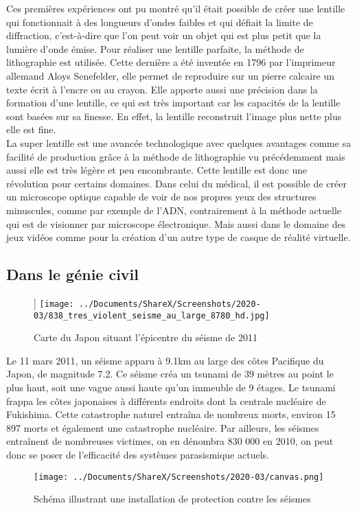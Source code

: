 \documentclass[12pt,a4paper]{article}
\begin{document}
	Ces premières expériences ont pu montré qu’il était possible de créer une lentille qui fonctionnait à des longueurs d’ondes faibles et qui défiait la limite de diffraction, c’est-à-dire que l’on peut voir un objet qui est plus petit que la lumière d’onde émise. Pour réaliser une lentille parfaite, la méthode de lithographie est utilisée. Cette dernière a été inventée en 1796 par l’imprimeur allemand Aloys Senefelder, elle permet de reproduire sur un pierre calcaire un texte écrit à l’encre ou au crayon. Elle apporte aussi une précision dans la formation d’une lentille, ce qui est très important car les capacités de la lentille sont basées sur sa finesse. En effet, la lentille reconstruit l’image plus nette plus elle est fine. \\

    La super lentille est une avancée technologique avec quelques avantages comme sa facilité de production grâce à la méthode de lithographie vu précédemment mais aussi elle est très légère et peu encombrante. Cette lentille est donc une révolution pour certains domaines. Dans celui du médical, il est possible de créer un microscope optique capable de voir de nos propres yeux des structures minuscules, comme par exemple de l’ADN, contrairement à la méthode actuelle qui est de visionner par microscope électronique. Mais aussi dans le domaine des jeux vidéos comme pour la création d’un autre type de casque de réalité virtuelle.\\
	\subsection{Dans le génie civil}

\begin{wrapfigure}{l}{7cm}]
\centering
\texttt{[image: ../Documents/ShareX/Screenshots/2020-03/838\_tres\_violent\_seisme\_au\_large\_8780\_hd.jpg]}
\caption{Carte du Japon situant l'épicentre du séisme de 2011}
\end{wrapfigure}

	
	Le 11 mars 2011, un séisme apparu à 9.1km au large des côtes Pacifique du Japon, de magnitude 7.2. Ce séisme créa un tsunami de 39 mètres au point le plus haut, soit une vague aussi haute qu’un immeuble de 9 étages. Le tsunami frappa les côtes japonaises à différents endroits dont la centrale nucléaire de Fukishima. Cette catastrophe naturel entraîna de nombreux morts, environ 15 897 morts et également une catastrophe nucléaire. 
Par ailleurs, les séismes entraînent de nombreuses victimes, on en dénombra 830 000 en 2010, on peut donc se poser de l'efficacité des systèmes parasismique actuels.
\begin{wrapfigure}{r}{5cm}
\centering
\texttt{[image: ../Documents/ShareX/Screenshots/2020-03/canvas.png]}
\caption{Schéma illustrant une installation de protection contre les séismes }
\end{wrapfigure}
\end{document}
